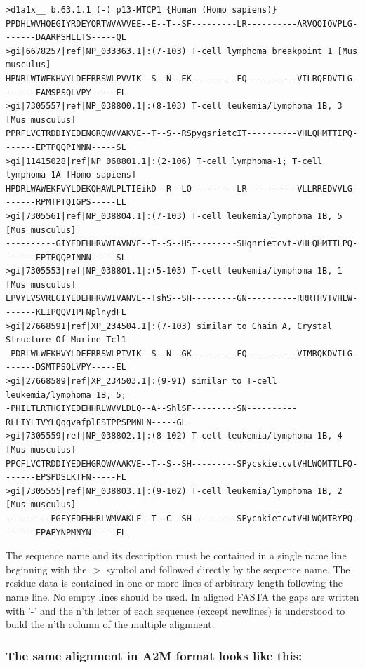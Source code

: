 \documentclass[11pt,a4paper]{article}
\begin{document}
\scriptsize
\begin{verbatim}
>d1a1x__ b.63.1.1 (-) p13-MTCP1 {Human (Homo sapiens)}
PPDHLWVHQEGIYRDEYQRTWVAVVEE--E--T--SF---------LR----------ARVQQIQVPLG-------DAARPSHLLTS-----QL
>gi|6678257|ref|NP_033363.1|:(7-103) T-cell lymphoma breakpoint 1 [Mus musculus]
HPNRLWIWEKHVYLDEFRRSWLPVVIK--S--N--EK---------FQ----------VILRQEDVTLG-------EAMSPSQLVPY-----EL
>gi|7305557|ref|NP_038800.1|:(8-103) T-cell leukemia/lymphoma 1B, 3 [Mus musculus]
PPRFLVCTRDDIYEDENGRQWVVAKVE--T--S--RSpygsrietcIT----------VHLQHMTTIPQ-------EPTPQQPINNN-----SL
>gi|11415028|ref|NP_068801.1|:(2-106) T-cell lymphoma-1; T-cell lymphoma-1A [Homo sapiens]
HPDRLWAWEKFVYLDEKQHAWLPLTIEikD--R--LQ---------LR----------VLLRREDVVLG-------RPMTPTQIGPS-----LL
>gi|7305561|ref|NP_038804.1|:(7-103) T-cell leukemia/lymphoma 1B, 5 [Mus musculus]
----------GIYEDEHHRVWIAVNVE--T--S--HS---------SHgnrietcvt-VHLQHMTTLPQ-------EPTPQQPINNN-----SL
>gi|7305553|ref|NP_038801.1|:(5-103) T-cell leukemia/lymphoma 1B, 1 [Mus musculus]
LPVYLVSVRLGIYEDEHHRVWIVANVE--TshS--SH---------GN----------RRRTHVTVHLW-------KLIPQQVIPFNplnydFL
>gi|27668591|ref|XP_234504.1|:(7-103) similar to Chain A, Crystal Structure Of Murine Tcl1
-PDRLWLWEKHVYLDEFRRSWLPIVIK--S--N--GK---------FQ----------VIMRQKDVILG-------DSMTPSQLVPY-----EL
>gi|27668589|ref|XP_234503.1|:(9-91) similar to T-cell leukemia/lymphoma 1B, 5;
-PHILTLRTHGIYEDEHHRLWVVLDLQ--A--ShlSF---------SN----------RLLIYLTVYLQqgvafplESTPPSPMNLN-----GL
>gi|7305559|ref|NP_038802.1|:(8-102) T-cell leukemia/lymphoma 1B, 4 [Mus musculus] 
PPCFLVCTRDDIYEDEHGRQWVAAKVE--T--S--SH---------SPycskietcvtVHLWQMTTLFQ-------EPSPDSLKTFN-----FL
>gi|7305555|ref|NP_038803.1|:(9-102) T-cell leukemia/lymphoma 1B, 2 [Mus musculus]
---------PGFYEDEHHRLWMVAKLE--T--C--SH---------SPycnkietcvtVHLWQMTRYPQ-------EPAPYNPMNYN-----FL
\end{verbatim}\normalsize

The sequence name and its description must be contained in a single name line beginning 
with the $>$ symbol and followed directly by the sequence name. The residue data is 
contained in one or more lines of arbitrary length following the name line. No empty 
lines should be used. In aligned FASTA the gaps are written with '-' and the n'th 
letter of each sequence (except newlines) is understood to build the n'th column of the 
multiple alignment. 


\subsubsection*{The same alignment in A2M format looks like this:}
\end{document}
